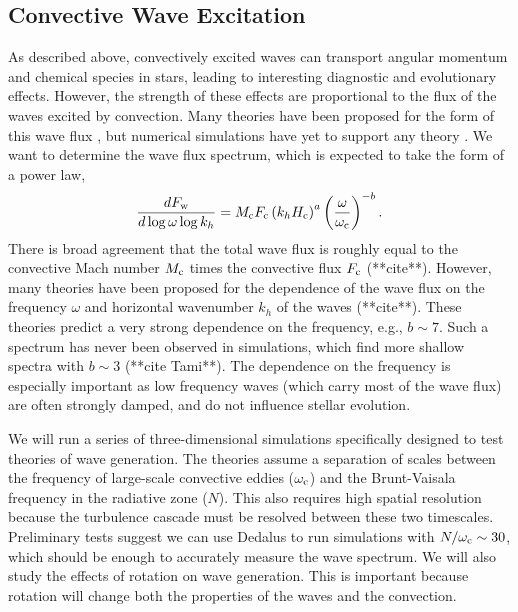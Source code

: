 {\color{purple}
\subsection{Convective Wave Excitation}
}

As described above, convectively excited waves can transport angular momentum and chemical species in stars, leading to interesting diagnostic and evolutionary effects. However, the strength of these effects are proportional to the flux of the waves excited by convection. Many theories have been proposed for the form of this wave flux \citep{Press_1981,Goldreich_1990,Belkacem_2008,Lecoanet_2013}, but numerical simulations have yet to support any theory \citep{Rogers_2006,Rogers_2013,Alvan_2014,Lecoanet_2015}. We want to determine the wave flux spectrum, which is expected to take the form of a power law,
\begin{equation}
\frac{d F_{\rm w}}{d\log \omega \log k_h} = M_{\rm c}F_{\rm c} \left(k_h H_{\rm c}\right)^{a} \left(\frac{\omega}{\omega_{\rm c}}\right)^{-b}.
\end{equation}
There is broad agreement that the total wave flux is roughly equal to the convective Mach number $M_{\rm c}$ times the convective flux $F_{\rm c}$ (**cite**). However, many theories have been proposed for the dependence of the wave flux on the frequency $\omega$ and horizontal wavenumber $k_h$ of the waves (**cite**). These theories predict a very strong dependence on the frequency, e.g., $b\sim 7$. Such a spectrum has never been observed in simulations, which find more shallow spectra with $b\sim 3$ (**cite Tami**). The dependence on the frequency is especially important as low frequency waves (which carry most of the wave flux) are often strongly damped, and do not influence stellar evolution. 

We will run a series of three-dimensional simulations specifically designed to test theories of wave generation. The theories assume a separation of scales between the frequency of large-scale convective eddies ($\omega_{\rm c}$) and the Brunt-Vaisala frequency in the radiative zone ($N$). This also requires high spatial resolution because the turbulence cascade must be resolved between these two timescales. Preliminary tests suggest we can use Dedalus to run simulations with $N/\omega_{\rm c}\sim 30$, which should be enough to accurately measure the wave spectrum. We will also study the effects of rotation on wave generation. This is important because rotation will change both the properties of the waves and the convection.

